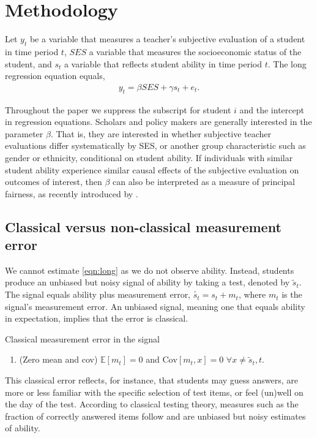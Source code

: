 \section{Methodology}\label{sec:Model}

Let $y_t$ be a variable that measures a teacher's subjective evaluation of a student in time period $t$, $SES$ a variable that measures the socioeconomic status of the student, and $s_t$ a variable that reflects student ability in time period $t$. The long regression equation equals,
\begin{align} \label{eqn:long}
    y_{t}= \beta SES + \gamma s_{t}+e_{t}.
\end{align}

Throughout the paper we suppress the subscript for student $i$ and the intercept in regression equations. Scholars and policy makers are generally interested in the parameter $\beta$. That is, they are interested in whether subjective teacher evaluations differ systematically by SES, or another group characteristic such as gender or ethnicity, conditional on student ability. If individuals with similar student ability experience similar causal effects of the subjective evaluation on outcomes of interest, then $\beta$ can also be interpreted as a measure of principal fairness, as recently introduced by \cite{imai2023principal}.

\subsection{Classical versus non-classical measurement error}

We cannot estimate \eqref{eqn:long} as we do not observe ability. Instead, students produce an unbiased but noisy signal of ability by taking a test, denoted by $\widetilde{s}_{t}$. The signal equals ability plus measurement error, $\widetilde{s_t}=s_t+m_t$, where $m_t$ is the signal's measurement error. An unbiased signal, meaning one that equals ability in expectation, implies that the error is classical.
\begin{assumption}\label{ass:classical}
Classical measurement error in the signal
\renewcommand{\theenumi}{\alph{enumi}}
\begin{enumerate}
    \item[] (Zero mean and cov) $\mathbb{E}[m_{t}]=0$ and $\mathrm{Cov}[m_{t},x]=0$ $\forall x \neq \widetilde{s}_t, t$. 
\end{enumerate} 
\end{assumption}
This classical error reflects, for instance, that students may guess answers, are more or less familiar with the specific selection of test items, or feel (un)well on the day of the test. According to classical testing theory, measures such as the fraction of correctly answered items follow  and are unbiased but noisy estimates of ability.

